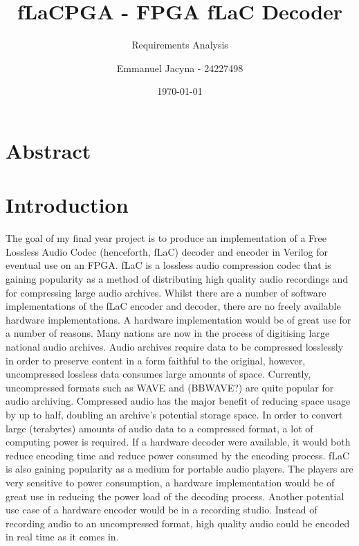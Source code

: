 \documentclass[12pt]{scrartcl}
\title{fLaCPGA - FPGA fLaC Decoder}
\subtitle{Requirements Analysis}
\author{Emmanuel Jacyna - 24227498}
\date{\today}
\begin{document}
\pagestyle{myheadings}
  \maketitle
  \tableofcontents
  
  \section*{Abstract}
  
  \section{Introduction}
  The goal of my final year project is to produce an implementation of a Free Lossless Audio Codec (henceforth, fLaC) decoder and encoder in Verilog for eventual use on an FPGA. fLaC is a lossless audio compression codec that is gaining popularity as a method of distributing high quality audio recordings and for compressing large audio archives\cite{findcite}. Whilst there are a number of software implementations of the fLaC encoder and decoder, there are no freely available hardware implementations. A hardware implementation would be of great use for a number of reasons. Many nations are now in the process of digitising large national audio archives. Audio archives require data to be compressed losslessly in order to preserve content in a form faithful to the original, however, uncompressed lossless data consumes large amounts of space. Currently, uncompressed formats such as WAVE and (BBWAVE?) are quite popular for audio archiving\cite{findcite}. Compressed audio has the major benefit of reducing space usage by up to half, doubling an archive's potential storage space. In order to convert large (terabytes) amounts of audio data to a compressed format, a lot of computing power is required. If a hardware decoder were available, it would both reduce encoding time and reduce power consumed by the encoding process. fLaC is also gaining popularity as a medium for portable audio players. The players are very sensitive to power consumption, a hardware implementation would be of great use in reducing the power load of the decoding process. Another potential use case of a hardware encoder would be in a recording studio. Instead of recording audio to an uncompressed format, high quality audio could be encoded in real time as it comes in.
  
\end{document}
